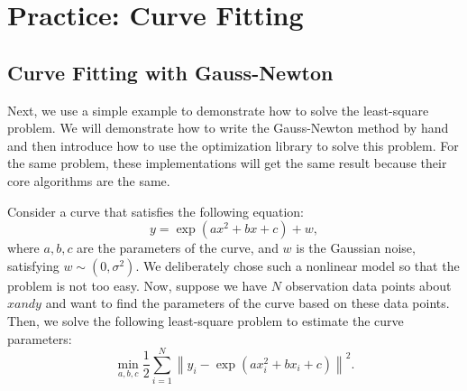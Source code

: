 \section{Practice: Curve Fitting}
\subsection{Curve Fitting with Gauss-Newton}
Next, we use a simple example to demonstrate how to solve the least-square problem. We will demonstrate how to write the Gauss-Newton method by hand and then introduce how to use the optimization library to solve this problem. For the same problem, these implementations will get the same result because their core algorithms are the same.

Consider a curve that satisfies the following equation:
\[
y = \exp( ax^2 + bx + c ) + w,
\]
where $a, b, c$ are the parameters of the curve, and $w$ is the Gaussian noise, satisfying $w \sim (0, \sigma^2)$. We deliberately chose such a nonlinear model so that the problem is not too easy. Now, suppose we have $N$ observation data points about $x and y$ and want to find the parameters of the curve based on these data points. Then, we solve the following least-square problem to estimate the curve parameters:
\begin{equation}
    \min \limits_{a,b,c} \frac{1}{2}\sum\limits_{i = 1}^N {{{\left\| {{y_i} - \exp \left( {ax_i^2 + bx_i + c} \right)} \right\|}^2}} .
\end{equation}

